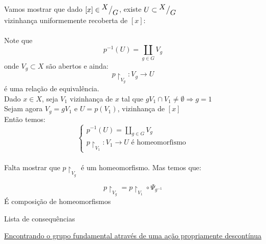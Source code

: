 \begin{dem}
    Vamos mostrar que dado $[x] \in\mkern-18mu \quad{^{\textstyle X}\big/_{\textstyle G}}$, existe $U \subset\mkern-18mu \quad{^{\textstyle X}\big/_{\textstyle G}}$ \\
    vizinhança uniformemente recoberta de $[x]$:\\\\
    Note que \[p^{-1}(U) = \coprod_{g \in G} V_g \] onde $V_g \subset X $ são abertos e ainda:
    \[p\restriction_{V_g}:V_g \rightarrow U\] é uma relação de equivalência.\\
    Dado $x \in X$, seja $V_1$ vizinhança de $x$ tal que $gV_1\cap V_1 \neq \emptyset \Rightarrow g = 1$\\
    Sejam agora $V_g = gV_1$ e $U = p(V_1)$, vizinhança de $[x]$\\
    Então temos:\\
    $$
        \begin{cases}
            p^{-1}(U) = \coprod_{g\in G} V_g\\
            p\restriction_{V_1}:V_1 \rightarrow U \text{ é homeomorfismo}
        \end{cases}
    $$\\
    Falta mostrar que $p\restriction_{V_g}$ é um homeomorfismo. Mas temos que:

    \[
        p\restriction_{V_g} = p\restriction_{V_1} \circ \Psi_{g^{-1}}
    \]
    É composição de homeomorfismos
\end{dem}

\begin{titlemize}{Lista de consequências}
    \item \hyperref[ações-de-grupos-e-gr-fundamental-prop]{Encontrando o grupo fundamental através de uma ação propriamente descontínua}
\end{titlemize}


